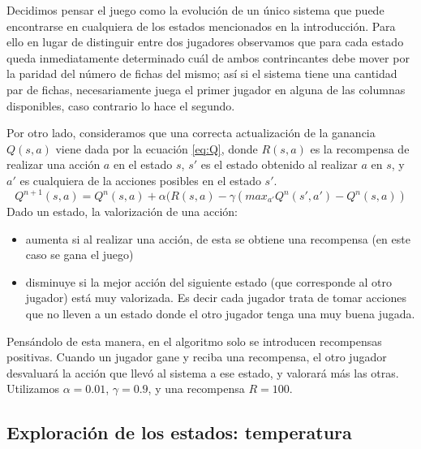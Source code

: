 \documentclass[11pt, spanish]{article}
\begin{document}
\par Decidimos pensar el juego como la evolución de un único sistema que puede 
encontrarse en cualquiera de los estados mencionados en la introducción. Para 
ello en lugar de distinguir entre dos jugadores observamos que para cada estado 
queda inmediatamente determinado cuál de ambos contrincantes debe mover por la 
paridad del número de fichas del mismo; así si el sistema tiene una cantidad par 
de fichas, necesariamente juega el primer jugador en alguna de las columnas 
disponibles, caso contrario lo hace el segundo.
\par Por otro lado, consideramos que una correcta actualización de la ganancia 
$Q(s,a)$ viene dada por la ecuación \ref{eq:Q}, donde $R(s,a)$ es la recompensa 
de realizar una acción $a$ en el estado $s$, $s'$ es el estado obtenido al 
realizar $a$ en $s$, y $a'$ es cualquiera de la acciones posibles en el estado 
$s'$.
\begin{equation}
Q^{n+1}(s,a) = Q^{n}(s,a) + \alpha (R(s,a) - \gamma (max_{a'}Q^n(s',a') - Q^n(s,a))
\label{eq:Q}
\end{equation} 
Dado un estado, la valorización de una acción:
\begin{itemize}
\item aumenta si al realizar una acción, de esta se obtiene una recompensa (en este caso se gana el juego)
\item disminuye si la mejor acción del siguiente estado (que corresponde al otro jugador) está muy valorizada. Es decir cada jugador trata de tomar acciones que no lleven a un estado donde el otro jugador tenga una muy buena jugada.
\end{itemize}
Pensándolo de esta manera, en el algoritmo solo se introducen recompensas 
positivas. Cuando un jugador gane y reciba una recompensa, el otro jugador 
desvaluará la acción que llevó al sistema a ese estado, y valorará más las 
otras. Utilizamos $\alpha = 0.01$, $\gamma = 0.9$, y una recompensa $R = 100$.

\subsection{Exploración de los estados: temperatura}
\end{document}

